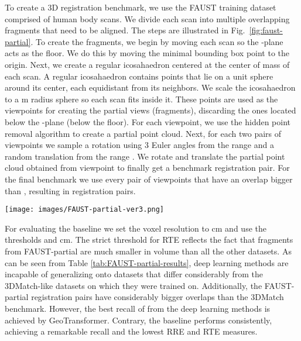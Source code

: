 \documentclass{bmvc2k}
\begin{document}
To create a 3D registration benchmark, we use the FAUST training dataset comprised of  human body scans. We divide each scan into multiple overlapping fragments that need to be aligned. The steps are illustrated in Fig.~\ref{fig:faust-partial}. To create the fragments, we begin by moving each scan so the -plane acts as the floor. We do this by moving the minimal bounding box point to the origin. Next, we create a regular icosahaedron centered at the center of mass of each scan. A regular icosahaedron contains  points that lie on a unit sphere around its center, each equidistant from its neighbors. We scale the icosahaedron to a m radius sphere so each scan fits inside it. These points are used as the viewpoints for creating the partial views (fragments), discarding the ones located below the -plane (below the floor). For each viewpoint, we use the hidden point removal \cite{hidden_point_removal} algorithm to create a partial point cloud. 
Next, for each two pairs of viewpoints  we sample a rotation using 3 Euler angles from the range  and a random translation from the range . We rotate and translate the partial point cloud obtained from viewpoint  to finally get a benchmark registration pair. For the final benchmark we use every pair of viewpoints that have an overlap bigger than , resulting in  registration pairs.

\begin{figure*}
\begin{center}

\texttt{[image: images/FAUST-partial-ver3.png]}
\end{center} 
   \caption{FAUST-partial dataset generation. For a given scan from the FAUST \cite{FAUST} dataset, we translate its minimal bounding box point to the origin. Next, we surround the scan with a regular icosahaedron. Each point of the icosahaedron acts as a viewpoint used to create a partial scan using the hidden point removal algorithm \cite{hidden_point_removal}. For two partial scans with an overalp bigger than , we use a random rotation and translation to obtain a registration pair for the FAUST-partial benchmark.}
\label{fig:faust-partial}
\end{figure*}

For evaluating the baseline we set the voxel resolution to cm and use the thresholds  and cm. The strict threshold for RTE reflects the fact that fragments from FAUST-partial are much smaller in volume than all the other datasets. As can be seen from Table \ref{tab:FAUST-partial-results}, deep learning methods are incapable of generalizing onto datasets that differ considerably from the 3DMatch-like datasets on which they were trained on. Additionally, the FAUST-partial registration pairs have considerably bigger overlaps  than the 3DMatch benchmark. However, the best recall of   from the deep learning methods is achieved by GeoTransformer. Contrary, the baseline performs consistently, achieving a remarkable  recall and the lowest RRE and RTE measures. 
\end{document}
